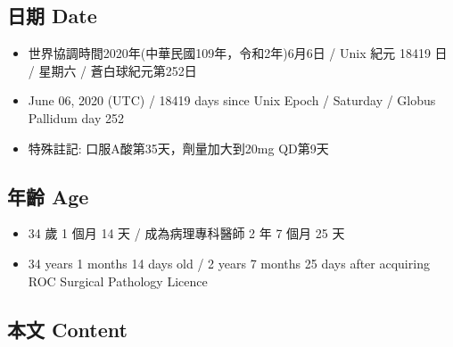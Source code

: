 \documentclass[
]{article}
\providecommand{\tightlist}{%
  \setlength{\itemsep}{0pt}\setlength{\parskip}{0pt}}
\begin{document}
\hypertarget{ux65e5ux671f-date-5}{%
\subsection{日期 Date}\label{ux65e5ux671f-date-5}}

\begin{itemize}
\tightlist
\item
  世界協調時間2020年(中華民國109年，令和2年)6月6日 / Unix 紀元 18419 日
  / 星期六 / 蒼白球紀元第252日
\item
  June 06, 2020 (UTC) / 18419 days since Unix Epoch / Saturday / Globus
  Pallidum day 252
\item
  特殊註記: 口服A酸第35天，劑量加大到20mg QD第9天
\end{itemize}

\hypertarget{ux5e74ux9f61-age-5}{%
\subsection{年齡 Age}\label{ux5e74ux9f61-age-5}}

\begin{itemize}
\tightlist
\item
  34 歲 1 個月 14 天 / 成為病理專科醫師 2 年 7 個月 25 天
\item
  34 years 1 months 14 days old / 2 years 7 months 25 days after
  acquiring ROC Surgical Pathology Licence
\end{itemize}

\hypertarget{ux672cux6587-content-5}{%
\subsection{本文 Content}\label{ux672cux6587-content-5}}
\end{document}
